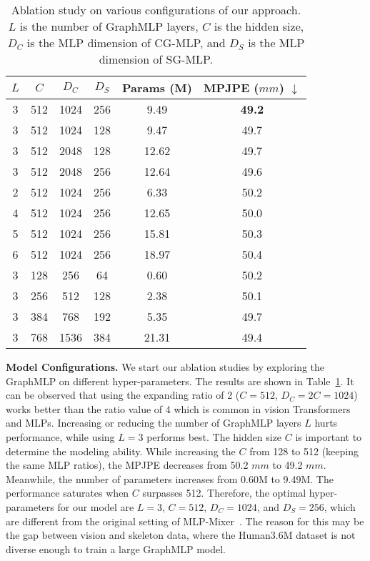 \documentclass[lettersize,journal]{IEEEtran}
\begin{document}
\begin{table}[t]
  \centering
  \caption
  {
    Ablation study on various configurations of our approach. 
    $L$ is the number of GraphMLP layers, $C$ is the hidden size, $D_{C}$ is the MLP dimension of CG-MLP, and $D_{S}$ is the MLP dimension of SG-MLP. 
  }
  \setlength{\tabcolsep}{3.10mm}
  \begin{tabular}{cccccc}
    \toprule
    $L$& $C$& $D_{C}$& $D_{S}$& Params (M) & MPJPE ($mm$) $\downarrow$ \\
    \midrule
    3& 512& 1024& 256& 9.49& \textbf{49.2} \\
    \midrule

    3& 512& 1024& 128& 9.47& 49.7 \\
    3& 512& 2048& 128& 12.62& 49.7 \\
    3& 512& 2048& 256& 12.64& 49.6 \\

    \midrule  

    2& 512& 1024& 256& 6.33& 50.2 \\
    4& 512& 1024& 256& 12.65& 50.0 \\
    5& 512& 1024& 256& 15.81& 50.3 \\
    6& 512& 1024& 256& 18.97& 50.4 \\

    \midrule

    3& 128& 256& 64& 0.60& 50.2 \\
    3& 256& 512& 128& 2.38& 50.1 \\
    3& 384& 768& 192& 5.35& 49.7 \\
    3& 768& 1536& 384 & 21.31& 49.4 \\
\toprule
\end{tabular}
\label{table:parameters}
\end{table}

\noindent \textbf{Model Configurations.}
We start our ablation studies by exploring the GraphMLP on different hyper-parameters. 
The results are shown in Table~\ref{table:parameters}. 
It can be observed that using the expanding ratio of 2 ($C = 512$, $D_{C} = 2C = 1024$) works better than the ratio value of 4 which is common in vision Transformers and MLPs. 
Increasing or reducing the number of GraphMLP layers $L$ hurts performance, while using $L = 3$ performs best. 
The hidden size $C$ is important to determine the modeling ability. 
While increasing the $C$ from 128 to 512 (keeping the same MLP ratios), the MPJPE decreases from 50.2 $mm$ to 49.2 $mm$. 
Meanwhile, the number of parameters increases from 0.60M to 9.49M. 
The performance saturates when $C$ surpasses 512. 
Therefore, the optimal hyper-parameters for our model are $L = 3$, $C {= }512$, $D_{C} = 1024$, and $D_{S} = 256$, which are different from the original setting of MLP-Mixer~\cite{mlpmixer}. 
The reason for this may be the gap between vision and skeleton data, where the Human3.6M dataset is not diverse enough to train a large GraphMLP model. 
\end{document}
